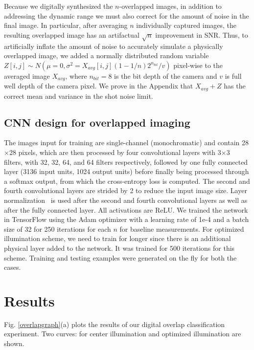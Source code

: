 \documentclass{article}
\begin{document}
Because we digitally synthesized the $n$-overlapped images, in addition to addressing the dynamic range we must also correct for the amount of noise in the final image. In particular, after averaging $n$ individually captured images, the resulting overlapped image has an artifactual $\sqrt{n}$ improvement in SNR. Thus, to artificially inflate the amount of noise to accurately simulate a physically overlapped image, we added a normally distributed random variable $Z[i,j] \sim N(\mu=0,\sigma^2=X_{avg}[i,j](1-1/n)2^{n_{bit}}/v)$ pixel-wise to the averaged image $X_{avg}$, where $n_{bit}=8$ is the bit depth of the camera and $v$ is full well depth of the camera pixel. We prove in the Appendix that $X_{avg}+Z$ has the correct mean and variance in the shot noise limit.

\subsection{CNN design for overlapped imaging}

The images input for training are single-channel (monochromatic) and contain 28$\times$28 pixels, which are then processed by four convolutional layers with 3$\times$3 filters, with 32, 32, 64, and 64 filters respectively, followed by one fully connected layer (3136 input units, 1024 output units) before finally being processed through a softmax output, from which the cross-entropy loss is computed. The second and fourth convolutional layers are strided by 2 to reduce the input image size. Layer normalization~\cite{layernorm} is used after the second and fourth convolutional layers as well as after the fully connected layer. All activations are ReLU. We trained the network in TensorFlow using the Adam optimizer with a learning rate of 1e-4 and a batch size of 32 for 250 iterations for each $n$ for baseline measurements. For optimized illumination scheme, we need to train for longer since there is an additional physical layer added to the network. It was trained for 500 iterations for this scheme. Training and testing examples were generated on the fly for both the cases.

\section{Results}

Fig. \ref{overlapgraph}(a) plots the results of our digital overlap classification experiment. Two curves: for center illumination and optimized illumination are shown. 
\end{document}
